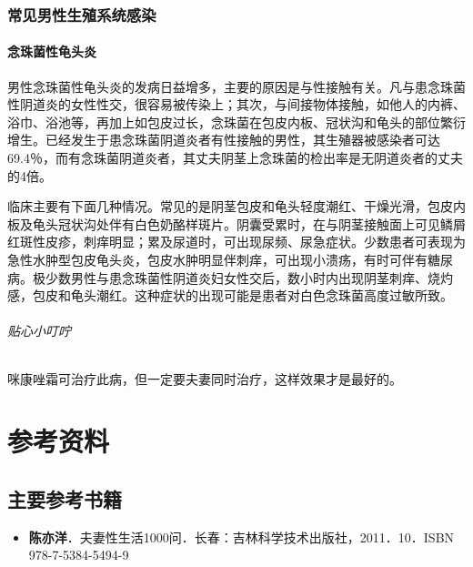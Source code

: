 \subsection{常见男性生殖系统感染}

\subsubsection{念珠菌性龟头炎}

男性念珠菌性龟头炎的发病日益增多，主要的原因是与性接触有关。凡与患念珠菌性阴道炎的女性性交，很容易被传染上；其次，与间接物体接触，如他人的内裤、浴巾、浴池等，再加上如包皮过长，念珠菌在包皮内板、冠状沟和龟头的部位繁衍增生。已经发生于患念珠菌阴道炎者有性接触的男性，其生殖器被感染者可达69.4％，而有念珠菌阴道炎者，其丈夫阴茎上念珠菌的检出率是无阴道炎者的丈夫的4倍。

临床主要有下面几种情况。常见的是阴茎包皮和龟头轻度潮红、干燥光滑，包皮内板及龟头冠状沟处伴有白色奶酪样斑片。阴囊受累时，在与阴茎接触面上可见鳞屑红斑性皮疹，刺痒明显；累及尿道时，可出现尿频、尿急症状。少数患者可表现为急性水肿型包皮龟头炎，包皮水肿明显伴刺痒，可出现小溃疡，有时可伴有糖尿病。极少数男性与患念珠菌性阴道炎妇女性交后，数小时内出现阴茎刺痒、烧灼感，包皮和龟头潮红。这种症状的出现可能是患者对白色念珠菌高度过敏所致。

\subparagraph{贴心小叮咛}

咪康唑霜可治疗此病，但一定要夫妻同时治疗，这样效果才是最好的。

\chapter{参考资料}

\section{主要参考书籍}

\begin{itemize}
    \item \textbf{陈亦洋}．夫妻性生活1000问．长春：吉林科学技术出版社，2011．10．ISBN 978-7-5384-5494-9
\end{itemize}

